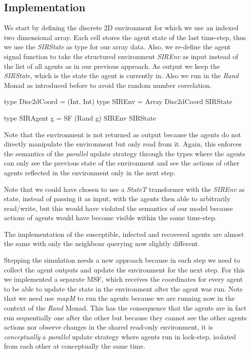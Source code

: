 \subsection{Implementation}
\label{sub:timedriven_thirdstep_impl}
We start by defining the discrete 2D environment for which we use an indexed two dimensional array. Each cell stores the agent state of the last time-step, thus we use the \textit{SIRState} as type for our array data. Also, we re-define the agent signal function to take the structured environment \textit{SIREnv} as input instead of the list of all agents as in our previous approach. As output we keep the \textit{SIRState}, which is the state the agent is currently in. Also we run in the \textit{Rand} Monad as introduced before to avoid the random number correlation. 

\begin{HaskellCode}
type Disc2dCoord = (Int, Int)
type SIREnv      = Array Disc2dCoord SIRState

type SIRAgent g  = SF (Rand g) SIREnv SIRState
\end{HaskellCode}

Note that the environment is not returned as output because the agents do not directly manipulate the environment but only read from it. Again, this enforces the semantics of the \textit{parallel} update strategy through the types where the agents can only see the previous state of the environment and see the actions of other agents reflected in the environment only in the next step.

Note that we could have chosen to use a \textit{StateT} transformer with the \textit{SIREnv} as state, instead of passing it as input, with the agents then able to arbitrarily read/write, but this would have violated the semantics of our model because actions of agents would have become visible within the same time-step.

The implementation of the susceptible, infected and recovered agents are almost the same with only the neighbour querying now slightly different. 

Stepping the simulation needs a new approach because in each step we need to collect the agent outputs and update the environment for the next step. For this we implemented a separate MSF, which receives the coordinates for every agent to be able to update the state in the environment after the agent was run. Note that we need use \textit{mapM} to run the agents because we are running now in the context of the \textit{Rand} Monad. This has the consequence that the agents are in fact run sequentially one after the other but because they cannot see the other agents actions nor observe changes in the shared read-only environment, it is \textit{conceptually} a \textit{parallel} update strategy where agents run in lock-step, isolated from each other at conceptually the same time.
  
